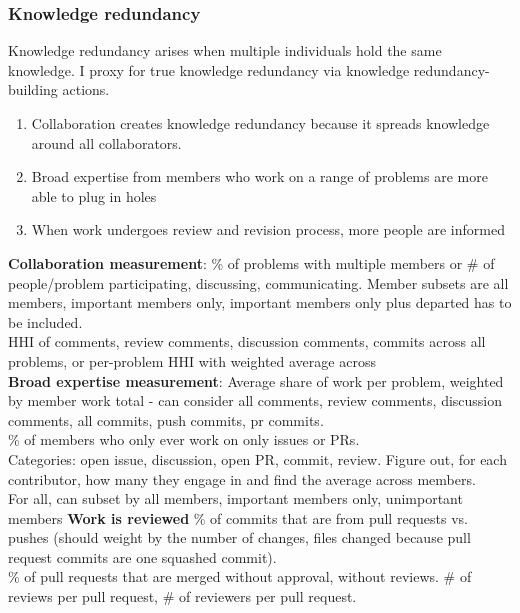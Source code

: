 \documentclass[12pt,notitlepage]{article}
\begin{document}
\subsubsection{Knowledge redundancy}
Knowledge redundancy arises when multiple individuals hold the same knowledge. I proxy for true knowledge redundancy via knowledge redundancy-building actions. 
\begin{enumerate}
    \item Collaboration creates knowledge redundancy because it spreads knowledge around all collaborators. 
    \item Broad expertise from members who work on a range of problems are more able to plug in holes
    \item When work undergoes review and revision process, more people are informed 
\end{enumerate}
\textbf{Collaboration measurement}: 
\% of problems with multiple members or \# of people/problem {participating, discussing, communicating}. Member subsets are all members, important members only, important members only plus departed has to be included. \\
HHI of {comments, review comments, discussion comments, commits} across all problems, or per-problem HHI with weighted average across \\
\textbf{Broad expertise measurement}:
Average share of work per problem, weighted by member work total - can consider {all comments, review comments, discussion comments, all commits, push commits, pr commits}. \\
\% of members who only ever work on only issues or PRs.\\
Categories: open issue, discussion, open PR, commit, review. Figure out, for each contributor, how many they engage in and find the average across members. \\
For all, can subset by {all members, important members only, unimportant members}
\textbf{Work is reviewed}
\% of commits that are from pull requests vs. pushes (should weight by the number of changes, files changed because pull request commits are one squashed commit). \\
\% of pull requests that are merged without approval, without reviews. \# of reviews per pull request, \# of reviewers per pull request. 
\end{document}
